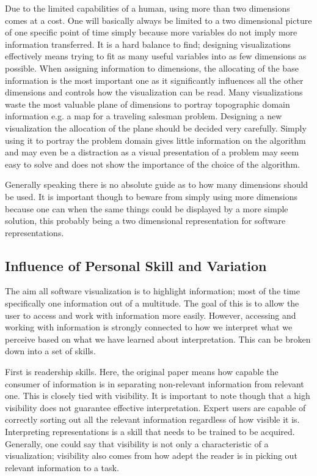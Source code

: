 \documentclass[11pt, a4paper, ngerman, twoside]{article}
\theoremstyle{plain}\newtheorem{Lemma}{Lemma}
\theoremstyle{plain}\newtheorem{Satz}[Lemma]{Satz}
\theoremstyle{definition}\newtheorem{Definition}[Lemma]{Definition}
\theoremstyle{definition}\newtheorem*{Beispiel}{Beispiel}
\theoremstyle{remark}\newtheorem*{Bemerkung}{Bemerkung}
\begin{document}
Due to the limited capabilities of a human, using more than two dimensions comes at a cost. One will basically always be limited to a two dimensional picture of one specific point of time simply because more variables do not imply more information transferred. It is a hard balance to find; designing visualizations effectively means trying to fit as many useful variables into as few dimensions as possible. When assigning information to dimensions, the allocating of the base information is the most important one as it significantly influences all the other dimensions and controls how the visualization can be read. Many visualizations waste the most valuable plane of dimensions to portray topographic domain information e.g. a map for a traveling salesman problem. Designing a new visualization the allocation of the plane should be decided very carefully. Simply using it to portray the problem domain gives little information on the algorithm and may even be a distraction as a visual presentation of a problem may seem easy to solve and does not show the importance of the choice of the algorithm\cite{macgregor}.

Generally speaking there is no absolute guide as to how many dimensions should be used. It is important though to beware from simply using more dimensions because one can when the same things could be displayed by a more simple solution, this probably being a two dimensional representation for software representations.

\subsection{Influence of Personal Skill and Variation}

The aim all software visualization is to highlight information; most of the time specifically one information out of a multitude. The goal of this is to allow the user to access and work with information more easily. However, accessing and working with information is strongly connected to how we interpret what we perceive based on what we have learned about interpretation. This can be broken down into a set of skills.

First is readership skills. Here, the original paper means how capable the consumer of information is in separating non-relevant information from relevant one. This is closely tied with visibility. It is important to note though that a high visibility does not guarantee effective interpretation. Expert users are capable of correctly sorting out all the relevant information regardless of how visible it is. Interpreting representations is a skill that needs to be trained to be acquired\cite{green}. Generally, one could say that visibility is not only a characteristic of a visualization; visibility also comes from how adept the reader is in picking out relevant information to a task.
\end{document}
